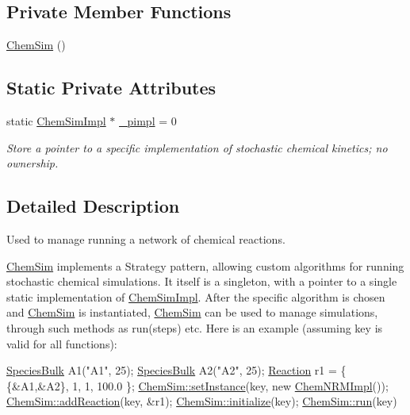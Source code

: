 \subsection*{Private Member Functions}
\begin{DoxyCompactItemize}
\item 
\hyperlink{classChemSim_a7a14b6058861d217c37f1d1f43b85db6}{Chem\+Sim} ()
\end{DoxyCompactItemize}
\subsection*{Static Private Attributes}
\begin{DoxyCompactItemize}
\item 
static \hyperlink{classChemSimImpl}{Chem\+Sim\+Impl} $\ast$ \hyperlink{classChemSim_a925fca4c4b0e800007163500b8b7909d}{\+\_\+pimpl} = 0
\begin{DoxyCompactList}\small\item\em Store a pointer to a specific implementation of stochastic chemical kinetics; no ownership. \end{DoxyCompactList}\end{DoxyCompactItemize}


\subsection{Detailed Description}
Used to manage running a network of chemical reactions. 

\hyperlink{classChemSim}{Chem\+Sim} implements a Strategy pattern, allowing custom algorithms for running stochastic chemical simulations. It itself is a singleton, with a pointer to a single static implementation of \hyperlink{classChemSimImpl}{Chem\+Sim\+Impl}. After the specific algorithm is chosen and \hyperlink{classChemSim}{Chem\+Sim} is instantiated, \hyperlink{classChemSim}{Chem\+Sim} can be used to manage simulations, through such methods as run(steps) etc. Here is an example (assuming key is valid for all functions)\+: 
\begin{DoxyCode}
\hyperlink{classSpeciesBulk}{SpeciesBulk} A1(\textcolor{stringliteral}{"A1"},  25);
\hyperlink{classSpeciesBulk}{SpeciesBulk} A2(\textcolor{stringliteral}{"A2"}, 25);
\hyperlink{classReaction}{Reaction} r1 = \{ \{&A1,&A2\}, 1, 1, 100.0 \};
\hyperlink{classChemSim_a0f8a949bc07480c36b590128180e56e7}{ChemSim::setInstance}(key, \textcolor{keyword}{new} \hyperlink{classChemNRMImpl}{ChemNRMImpl}());
\hyperlink{classChemSim_a7ef2b5545a5250201b96c666b5ba6f92}{ChemSim::addReaction}(key, &r1);
\hyperlink{classChemSim_affbdef9382a7c693a08f03f19e60d7fb}{ChemSim::initialize}(key);
\hyperlink{classChemSim_a60bf7095bcc35a4865a2bb191b070fc9}{ChemSim::run}(key)
\end{DoxyCode}


